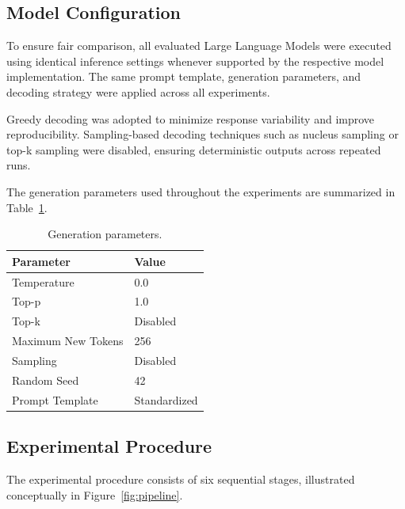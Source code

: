 \documentclass{article}
\begin{document}
\subsection{Model Configuration}

To ensure fair comparison, all evaluated Large Language Models were executed using identical inference settings whenever supported by the respective model implementation. The same prompt template, generation parameters, and decoding strategy were applied across all experiments.

Greedy decoding was adopted to minimize response variability and improve reproducibility. Sampling-based decoding techniques such as nucleus sampling or top-k sampling were disabled, ensuring deterministic outputs across repeated runs.

The generation parameters used throughout the experiments are summarized in Table~\ref{tab:generation}.

\begin{table}[h]
\centering
\caption{Generation parameters.}
\label{tab:generation}
\begin{tabular}{ll}
\hline
\textbf{Parameter} & \textbf{Value} \\
\hline
Temperature & 0.0 \\
Top-p & 1.0 \\
Top-k & Disabled \\
Maximum New Tokens & 256 \\
Sampling & Disabled \\
Random Seed & 42 \\
Prompt Template & Standardized \\
\hline
\end{tabular}
\end{table}

\subsection{Experimental Procedure}

The experimental procedure consists of six sequential stages, illustrated conceptually in Figure~\ref{fig:pipeline}.
\end{document}
